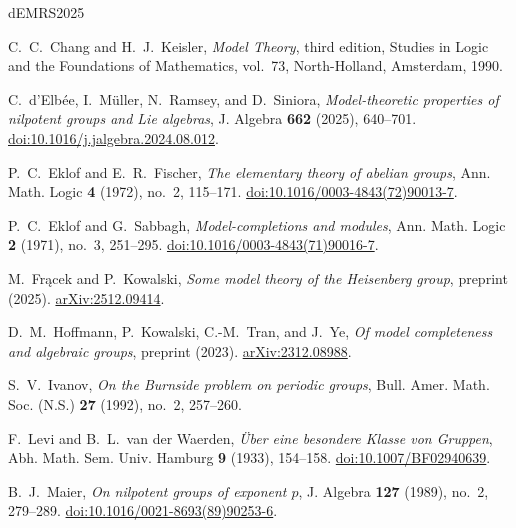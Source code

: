 \documentclass[11pt,reqno]{article}
\theoremstyle{definition}
\theoremstyle{remark}
\begin{document}
\begin{thebibliography}{dEMRS2025}

C.~C.~Chang and H.~J.~Keisler,
\emph{Model Theory},
third edition,
Studies in Logic and the Foundations of Mathematics, vol.~73,
North-Holland, Amsterdam, 1990.

C.~d'Elb\'ee, I.~M\"uller, N.~Ramsey, and D.~Siniora,
\emph{Model-theoretic properties of nilpotent groups and Lie algebras},
J. Algebra \textbf{662} (2025), 640--701.
\href{https://doi.org/10.1016/j.jalgebra.2024.08.012}
     {doi:10.1016/j.jalgebra.2024.08.012}.

P.~C.~Eklof and E.~R.~Fischer,
\emph{The elementary theory of abelian groups},
Ann. Math. Logic \textbf{4} (1972), no.~2, 115--171.
\href{https://doi.org/10.1016/0003-4843(72)90013-7}
     {doi:10.1016/0003-4843(72)90013-7}.

P.~C.~Eklof and G.~Sabbagh,
\emph{Model-completions and modules},
Ann. Math. Logic \textbf{2} (1971), no.~3, 251--295.
\href{https://doi.org/10.1016/0003-4843(71)90016-7}
     {doi:10.1016/0003-4843(71)90016-7}.

M.~Fr\k{a}cek and P.~Kowalski,
\emph{Some model theory of the Heisenberg group},
preprint (2025).
\href{https://arxiv.org/abs/2512.09414}{arXiv:2512.09414}.

D.~M.~Hoffmann, P.~Kowalski, C.-M.~Tran, and J.~Ye,
\emph{Of model completeness and algebraic groups},
preprint (2023).
\href{https://arxiv.org/abs/2312.08988}{arXiv:2312.08988}.

S.~V.~Ivanov,
\emph{On the Burnside problem on periodic groups},
Bull. Amer. Math. Soc. (N.S.) \textbf{27} (1992), no.~2, 257--260.

F.~Levi and B.~L.~van der Waerden,
\emph{\"Uber eine besondere Klasse von Gruppen},
Abh. Math. Sem. Univ. Hamburg \textbf{9} (1933), 154--158.
\href{https://doi.org/10.1007/BF02940639}
     {doi:10.1007/BF02940639}.

B.~J.~Maier,
\emph{On nilpotent groups of exponent $p$},
J. Algebra \textbf{127} (1989), no.~2, 279--289.
\href{https://doi.org/10.1016/0021-8693(89)90253-6}
     {doi:10.1016/0021-8693(89)90253-6}.


\end{thebibliography}
\end{document}
